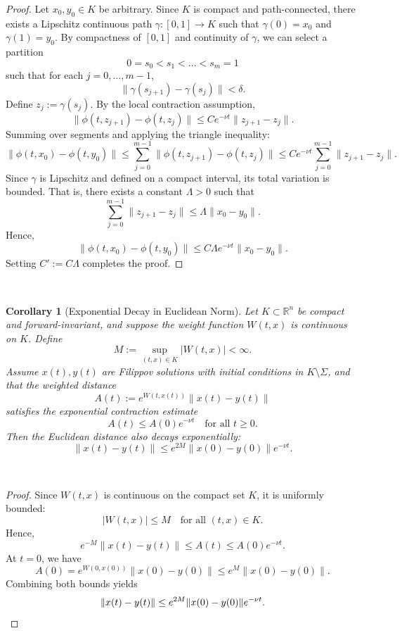 \documentclass[11pt]{article}
\newtheorem{corollary}{Corollary}
\begin{document}
\begin{proof}
	Let \( x_0, y_0 \in K \) be arbitrary. Since \( K \) is compact and path-connected, there exists a Lipschitz continuous path \( \gamma : [0,1] \to K \) such that \( \gamma(0) = x_0 \) and \( \gamma(1) = y_0 \). By compactness of \( [0,1] \) and continuity of \( \gamma \), we can select a partition
	\[
	0 = s_0 < s_1 < \dots < s_m = 1
	\]
	such that for each \( j = 0, \dots, m-1 \),
	\[
	\| \gamma(s_{j+1}) - \gamma(s_j) \| < \delta.
	\]
	Define \( z_j := \gamma(s_j) \). By the local contraction assumption,
	\[
	\|\phi(t, z_{j+1}) - \phi(t, z_j)\| \leq C e^{-\nu t} \|z_{j+1} - z_j\|.
	\]
	Summing over segments and applying the triangle inequality:
	\[
	\|\phi(t, x_0) - \phi(t, y_0)\| \leq \sum_{j=0}^{m-1} \|\phi(t, z_{j+1}) - \phi(t, z_j)\| \leq C e^{-\nu t} \sum_{j=0}^{m-1} \|z_{j+1} - z_j\|.
	\]
	Since \( \gamma \) is Lipschitz and defined on a compact interval, its total variation is bounded. That is, there exists a constant \( \Lambda > 0 \) such that
	\[
	\sum_{j=0}^{m-1} \|z_{j+1} - z_j\| \leq \Lambda \|x_0 - y_0\|.
	\]
	Hence,
	\[
	\|\phi(t, x_0) - \phi(t, y_0)\| \leq C \Lambda e^{-\nu t} \|x_0 - y_0\|.
	\]
	Setting \( C' := C \Lambda \) completes the proof.
\end{proof}


\

\begin{corollary}[Exponential Decay in Euclidean Norm]\label{cor:euclidean_decay}
	Let \( K \subset \mathbb{R}^n \) be compact and forward-invariant, and suppose the weight function \( W(t,x) \) is continuous on \( K \). Define
	\[
	M := \sup_{(t,x) \in K} |W(t,x)| < \infty.
	\]
	Assume \( x(t), y(t) \) are Filippov solutions with initial conditions in \( K \setminus \Sigma \), and that the weighted distance
	\[
	A(t) := e^{W(t,x(t))} \|x(t) - y(t)\|
	\]
	satisfies the exponential contraction estimate
	\[
	A(t) \leq A(0) e^{-\nu t} \quad \text{for all } t \geq 0.
	\]
	Then the Euclidean distance also decays exponentially:
	\[
	\|x(t) - y(t)\| \leq e^{2M} \|x(0) - y(0)\| e^{-\nu t}.
	\]
\end{corollary}

\

\begin{proof}
	Since \( W(t,x) \) is continuous on the compact set \( K \), it is uniformly bounded:
	\[
	|W(t,x)| \leq M \quad \text{for all } (t,x) \in K.
	\]
	Hence,
	\[
	e^{-M} \|x(t) - y(t)\| \leq A(t) \leq A(0) e^{-\nu t}.
	\]
	At \( t = 0 \), we have
	\[
	A(0) = e^{W(0,x(0))} \|x(0) - y(0)\| \leq e^{M} \|x(0) - y(0)\|.
	\]
	Combining both bounds yields
	\[
	\|x(t) - y(t)\| \leq e^{2M} \|x(0) - y(0)\| e^{-\nu t}. \qedhere
	\]
\end{proof}
\end{document}
